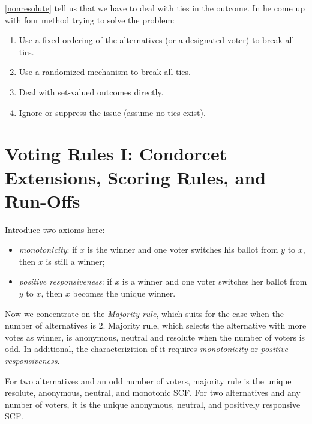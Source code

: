 \cref{nonresolute} tell us that we have to deal with ties in the outcome. In \cite{moulinHandbookComputationalSocial2016} he come up with four method trying to solve the problem:

\begin{enumerate}
    \item Use a fixed ordering of the alternatives (or a designated voter) to break all ties.
    \item Use a randomized mechanism to break all ties.
    \item Deal with set-valued outcomes directly.
    \item Ignore or suppress the issue (assume no ties exist).
\end{enumerate}

\section{Voting Rules I: Condorcet Extensions, Scoring Rules, and Run-Offs}

Introduce two axioms here:\\

\begin{definition}
    \begin{itemize}
        \item \textit{monotonicity}: if $x$ is the winner and one voter switches his ballot from $y$ to $x$, then $x$ is still a winner; 
        \item \textit{positive responsiveness}: if $x$ is a winner and one voter switches her ballot from $y$ to $x$, then $x$ becomes the unique winner.
    \end{itemize}
\end{definition}

Now we concentrate on the \textit{Majority rule}, which suits for the case when the number of alternatives is $2$. Majority rule, which selects the alternative with more votes as winner, is anonymous, neutral and resolute when the number of voters is odd. In additional, the characterizition of it requires \textit{monotonicity} or \textit{positive responsiveness}.

\begin{proposition}
    \label{ThMay}
    For two alternatives and an odd number of voters, majority rule is the unique resolute, anonymous, neutral, and monotonic SCF. For two alternatives and any number of voters, it is the unique anonymous, neutral, and positively responsive SCF.
\end{proposition}

